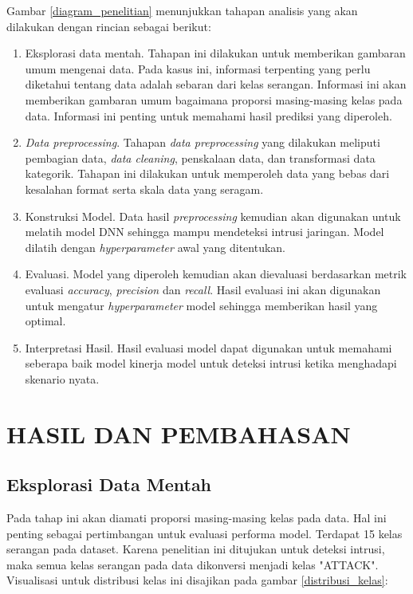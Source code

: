 \documentclass[a4paper,12pt]{report}
\begin{document}
Gambar \ref{diagram_penelitian} menunjukkan tahapan analisis yang akan dilakukan dengan rincian sebagai berikut:
\begin{enumerate}
	\item Eksplorasi data mentah. Tahapan ini dilakukan untuk memberikan gambaran umum mengenai data. Pada kasus ini, informasi terpenting yang perlu diketahui tentang data adalah sebaran dari kelas serangan. Informasi ini akan memberikan gambaran umum bagaimana proporsi masing-masing kelas pada data. Informasi ini penting untuk memahami hasil prediksi yang diperoleh.
	
	\item \textit{Data preprocessing}. Tahapan \textit{data preprocessing} yang dilakukan meliputi pembagian data, \textit{data cleaning}, penskalaan data, dan transformasi data kategorik. Tahapan ini dilakukan untuk memperoleh data yang bebas dari kesalahan format serta skala data yang seragam.
	
	\item Konstruksi Model. Data hasil \textit{preprocessing} kemudian akan digunakan untuk melatih model DNN sehingga mampu mendeteksi intrusi jaringan. Model dilatih dengan \textit{hyperparameter} awal yang ditentukan.
	
	\item Evaluasi. Model yang diperoleh kemudian akan dievaluasi berdasarkan metrik evaluasi \textit{accuracy}, \textit{precision} dan \textit{recall}. Hasil evaluasi ini akan digunakan untuk mengatur \textit{hyperparameter} model sehingga memberikan hasil yang optimal.
	
	\item Interpretasi Hasil. Hasil evaluasi model dapat digunakan untuk memahami seberapa baik model kinerja model untuk deteksi intrusi ketika menghadapi skenario nyata.
\end{enumerate}

\chapter{HASIL DAN PEMBAHASAN}
\section{Eksplorasi Data Mentah}
Pada tahap ini akan diamati proporsi masing-masing kelas pada data. Hal ini penting sebagai pertimbangan untuk evaluasi performa model. Terdapat 15 kelas serangan pada dataset. Karena penelitian ini ditujukan untuk deteksi intrusi, maka semua kelas serangan pada data dikonversi menjadi kelas "ATTACK". Visualisasi untuk distribusi kelas ini disajikan pada gambar \ref{distribusi_kelas}:
\end{document}

